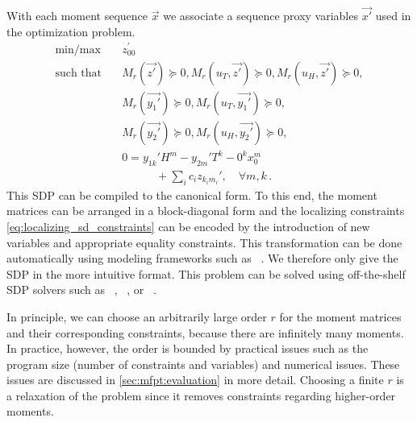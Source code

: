 With each moment sequence $\vec x$ we associate a sequence proxy
variables $\vec{x'}$
used in the optimization problem.
\begin{equation}\label{eq:sdp_for_fpt}
  \begin{split}
    \text{min} / \text{max} \hspace{1em}&  z_{00}^{\prime} \\
    \text{such that}\hspace{1em} & M_r(\vec{z'})\succeq 0,
    M_r({u}_T, \vec{z'})\succeq 0, M_r({u}_H, \vec{z'})\succeq 0,\\
    & M_r(\vec{y_1'}) \succeq 0, M_r({u}_T,\vec{y_1'}) \succeq 0,\\
    & M_r(\vec{y_2'}) \succeq 0, M_r({u}_H, \vec{y_2'}) \succeq 0,\\
    & 0= y_{1k}' H^m -  y_{2m}'T^k - 0^k x_0^m \\
    &\qquad\quad+\sum_i c_i  z_{k_i m_i}', \quad\forall m, k\,.
  \end{split}
\end{equation}
This \ac{SDP} can be compiled to the canonical form.
To this end, the moment matrices can be arranged in a block-diagonal
form and the
localizing constraints \eqref{eq:localizing_sd_constraints} can be encoded
by the introduction of new variables and appropriate equality constraints.
This transformation can be done automatically using modeling frameworks
such as ~\parencite{cvxpy}. We therefore only give the
\ac{SDP} in the more intuitive format.
This problem can be solved using off-the-shelf \ac{SDP} solvers such
as ~\parencite{mosek},
~\parencite{vandenberghe2010cvxopt}, or
~\parencite{scs}.

In principle, we can choose an arbitrarily large order $r$ for the
moment matrices
and their corresponding constraints, because there are
infinitely many moments.
In practice, however, the order is bounded by practical issues such
as the program size
(number of constraints and variables) and numerical issues.
These issues are discussed in \autoref{sec:mfpt:evaluation} in more detail.
Choosing a finite $r$ is a relaxation of the problem since it removes
constraints regarding
higher-order moments.

